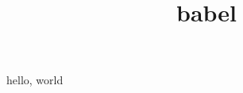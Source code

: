 \documentclass{amsart}
\title{babel}
\begin{document}
\guillemotleft hello, world\guillemotright
\end{document}
